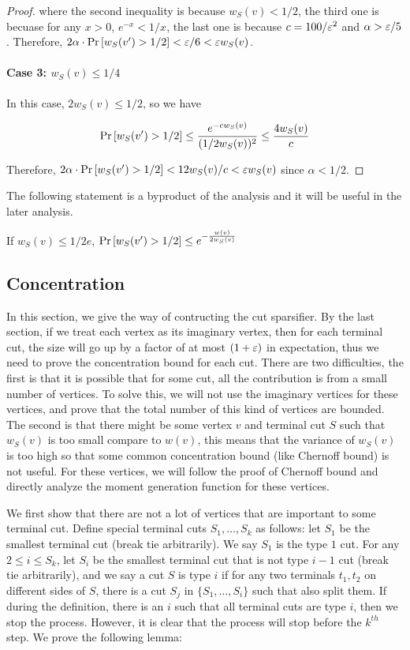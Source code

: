 \begin{proof}
where the second inequality is because $w_S(v) < 1/2$, the third one is becuase for any $x>0$, $e^{-x}<1/x$, the last one is because $c=100/{\varepsilon}^2$ and $\alpha>{\varepsilon}/5$. Therefore, $2\alpha \cdot \mathrm{Pr}\left[ w_S(v') > 1/2 \right] < {\varepsilon}/6 < {\varepsilon} w_S(v)$. 

\paragraph{Case 3: $w_S(v) \le 1/4$} In this case, $2w_S(v) \le 1/2$, so we have

\begin{align*}
    \mathrm{Pr}\left[ w_S(v') > 1/2 \right] \le \frac{e^{-c w_S(v)}}{(1/2w_S(v))^2} \le \frac{4w_S(v)}{c}
\end{align*}

Therefore, $2\alpha \cdot \mathrm{Pr}\left[ w_S(v') > 1/2 \right] < 12 w_S(v)/c < {\varepsilon} w_S(v)$ since $\alpha < 1/2$.
\end{proof}

The following statement is a byproduct of the analysis and it will be useful in the later analysis.

\begin{claim} \label{prop:v2}
    If $w_S(v) \le 1/2e$, $\mathrm{Pr}\left[ w_S(v') > 1/2 \right] \le e^{-\frac{w(v)}{2w_S(v)}}$
\end{claim}

\subsection{Concentration}
In this section, we give the way of contructing the cut sparsifier. By the last section, if we treat each vertex as its imaginary vertex, then for each terminal cut, the size will go up by a factor of at most $(1+{\varepsilon})$ in expectation, thus we need to prove the concentration bound for each cut. There are two difficulties, the first is that it is possible that for some cut, all the contribution is from a small number of vertices. To solve this, we will not use the imaginary vertices for these vertices, and prove that the total number of this kind of vertices are bounded. The second is that there might be some vertex $v$ and terminal cut $S$ such that $w_S(v)$ is too small compare to $w(v)$, this means that the variance of $w_S(v)$ is too high so that some common concentration bound (like Chernoff bound) is not useful. For these vertices, we will follow the proof of Chernoff bound and directly analyze the moment generation function for these vertices. 

We first show that there are not a lot of vertices that are important to some terminal cut. Define special terminal cuts $S_1,\dots, S_k$ as follows: let $S_1$ be the smallest terminal cut (break tie arbitrarily). We say $S_1$ is the type $1$ cut. For any $2 \le i \le S_k$, let $S_i$ be the smallest terminal cut that is not type $i-1$ cut (break tie arbitrarily), and we say a cut $S$ is type $i$ if for any two terminals $t_1, t_2$ on different sides of $S$, there is a cut $S_j$ in $\{S_1,\dots, S_i\}$ such that also split them. If during the definition, there is an $i$ such that all terminal cuts are type $i$, then we stop the process. However, it is clear that the process will stop before the $k^{th}$ step. We prove the following lemma:

